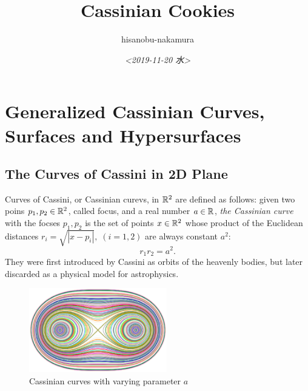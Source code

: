 \documentclass{article}
\author{hisanobu-nakamura}
\date{\textit{<2019-11-20 水>}}
\title{Cassinian Cookies}
\begin{document}
\maketitle
\tableofcontents


\section{Generalized Cassinian Curves, Surfaces and Hypersurfaces}
\label{sec-1}
\subsection{The Curves of Cassini in 2D Plane}
\label{sec-1-1}
Curves of Cassini, or Cassinian curevs, in $\mathbb R^2$ are defined as follows: given two poins $p_1, p_2 \in \mathbb R^2$, called focus, and a real number $a \in \mathbb R$, 
\emph{the Cassinian curve} with the focses $p_{1},p_{2}$ is the set of points $x \in \mathbb R^2$ whose product of the Euclidean distances $r_i = \sqrt{|x-p_i|}, \; (i=1,2)$ are always constant $a^2$:
\begin{equation}
\label{ }
r_1 r_2 = a^2.
\end{equation}
They were first introduced by Cassini as orbits of the heavenly bodies, but later discarded as a physical model for astrophysics.
\begin{figure}[h]
\begin{center}
\includegraphics[width=6cm]{cassini2.eps}
\caption{Cassinian curves with varying parameter $a$}
\label{ }
\end{center}
\end{figure}
\end{document}
